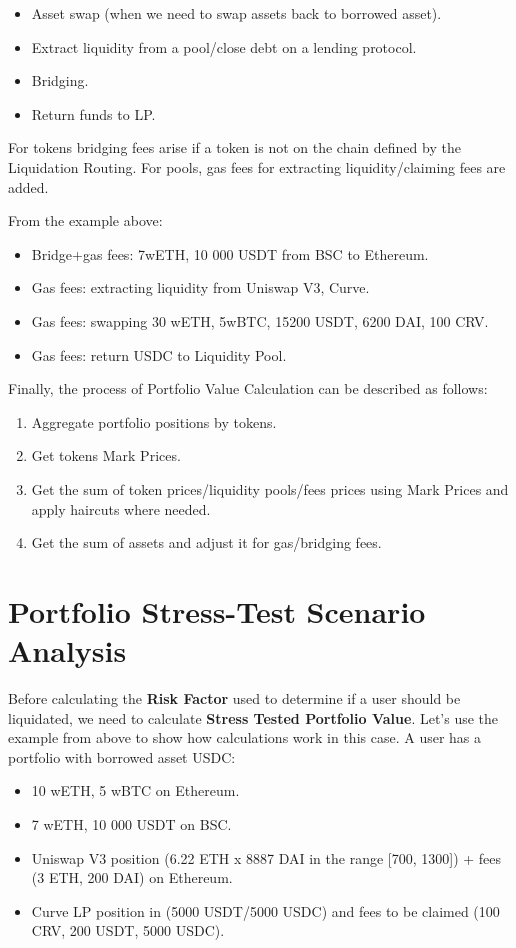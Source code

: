 \documentclass[conference]{IEEEtran}
\begin{document}
\begin{itemize}
	\item Asset swap (when we need to swap assets back to borrowed asset).
	\item Extract liquidity from a pool/close debt on a lending protocol.
	\item Bridging.
	\item Return funds to LP.
\end{itemize}

For tokens bridging fees arise if a token is not on the chain defined by the Liquidation Routing. For pools, gas fees for extracting liquidity/claiming fees are added.

From the example above:
\begin{itemize}
	\item Bridge+gas fees: 7wETH, 10 000 USDT from BSC to Ethereum.
	\item Gas fees: extracting liquidity from Uniswap V3, Curve.
	\item Gas fees: swapping 30 wETH, 5wBTC, 15200 USDT, 6200 DAI,  100 CRV.
	\item Gas fees: return USDC to Liquidity Pool.
\end{itemize}

Finally, the process of Portfolio Value Calculation can be described as follows:
\begin{enumerate}
	\item Aggregate portfolio positions by tokens.
	\item Get tokens Mark Prices.
	\item Get the sum of token prices/liquidity pools/fees prices using Mark Prices and apply haircuts where needed.
	\item Get the sum of assets and adjust it for gas/bridging fees.
\end{enumerate}

\section{Portfolio Stress-Test Scenario Analysis}
Before calculating the \textbf{Risk Factor} used to determine if a user should be liquidated, we need to calculate \textbf{Stress Tested Portfolio Value}. Let’s use the example from above to show how calculations work in this case. A user has a portfolio with borrowed asset USDC:

\begin{itemize}
	\item 10 wETH, 5 wBTC on Ethereum.
	\item 7 wETH, 10 000 USDT on BSC.
	\item Uniswap V3 position (6.22 ETH x 8887 DAI in the range [700, 1300]) + fees (3 ETH, 200 DAI) on Ethereum.
	\item Curve LP position in (5000 USDT/5000 USDC) and fees to be claimed (100 CRV, 200 USDT, 5000 USDC).
\end{itemize}
\end{document}
